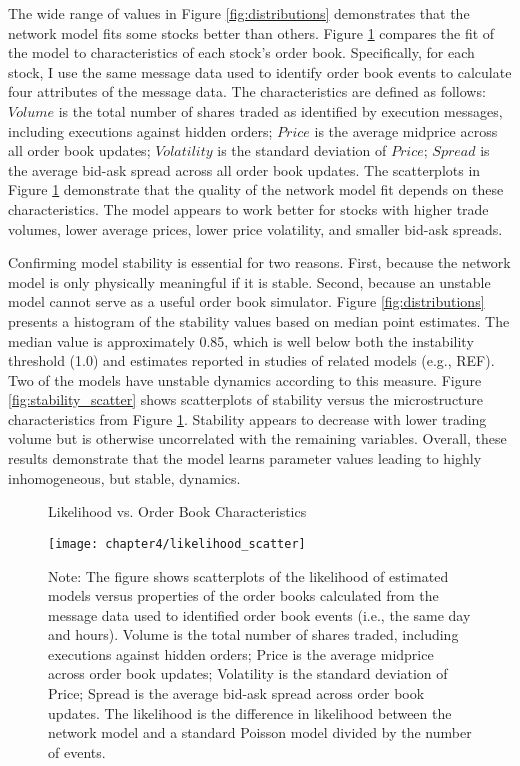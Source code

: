 		The wide range of values in Figure \ref{fig:distributions} demonstrates that the network model fits some stocks better than others. Figure \ref{fig:likelihood_scatter} compares the fit of the model to characteristics of each stock’s order book. Specifically, for each stock, I use the same message data used to identify order book events to calculate four attributes of the message data. The characteristics are defined as follows: $Volume$ is the total number of shares traded as identified by execution messages, including executions against hidden orders; $Price$ is the average midprice across all order book updates; $Volatility$ is the standard deviation of $Price$; $Spread$ is the average bid-ask spread across all order book updates. The scatterplots in Figure \ref{fig:likelihood_scatter} demonstrate that the quality of the network model fit depends on these characteristics. The model appears to work better for stocks with higher trade volumes, lower average prices, lower price volatility, and smaller bid-ask spreads.

		Confirming model stability is essential for two reasons. First, because the network model is only physically meaningful if it is stable. Second, because an unstable model cannot serve as a useful order book simulator. Figure \ref{fig:distributions} presents a histogram of the stability values based on median point estimates. The median value is approximately 0.85, which is well below both the instability threshold (1.0) and estimates reported in studies of related models (e.g., REF). Two of the models have unstable dynamics according to this measure. Figure \ref{fig:stability_scatter} shows scatterplots of stability versus the microstructure characteristics from Figure \ref{fig:likelihood_scatter}. Stability appears to decrease with lower trading volume but is otherwise uncorrelated with the remaining variables. Overall, these results demonstrate that the model learns parameter values leading to highly inhomogeneous, but stable, dynamics.

		\begin{figure}[p]
			\small
			\linespread{1}
			\centering
			\captionsetup{labelsep=colon, font=footnotesize, justification=centerfirst, width=\linewidth}
			\caption{Likelihood vs. Order Book Characteristics}
			\label{fig:likelihood_scatter}
			\texttt{[image: chapter4/likelihood\_scatter]}
			\captionsetup{position=below, font=footnotesize, justification=justified, width=\linewidth}
			\caption*{Note: The figure shows scatterplots of the likelihood of estimated models versus properties of the order books calculated from the message data used to identified order book events (i.e., the same day and hours). Volume is the total number of shares traded, including executions against hidden orders; Price is the average midprice across order book updates; Volatility is the standard deviation of Price; Spread is the average bid-ask spread across order book updates. The likelihood is the difference in likelihood between the network model and a standard Poisson model divided by the number of events.}
		\end{figure}

